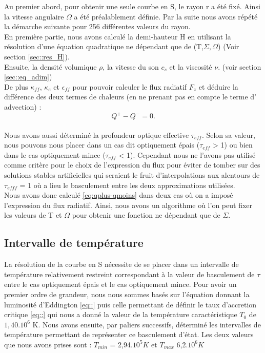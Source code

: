 Au premier abord, pour obtenir une seule courbe en S, le rayon r a été fixé. Ainsi la vitesse angulaire $\Omega$ a été préalablement définie. Par la suite nous avons répété la démarche suivante pour 256 différentes valeurs du rayon.
\\
En première partie, nous avons calculé la demi-hauteur H en utilisant la résolution d'une équation quadratique ne dépendant que de (T,$\Sigma,\Omega$) (Voir section \ref{sec::res_H}).
\\
Ensuite, la densité volumique $\rho$, la vitesse du son $c_s$ et la viscosité $\nu$. (voir section \ref{sec::eq_adim})
\\
De plus $\kappa_{ff}$, $\kappa_{e}$ et $\epsilon_{ff}$ pour pouvoir calculer le flux radiatif $F_z$ et déduire la différence des deux termes de chaleurs (en ne prenant pas en compte le terme d' advection) :
\\
\begin{equation} 
\label{eq:qplus-qmoins}
Q^+ - Q^- = 0. 
\end{equation}
\\
Nous avons aussi déterminé la profondeur optique effective $\tau_{eff}$. Selon sa valeur, nous pouvons nous placer dans un cas dit optiquement épais ($\tau_{eff}$ > 1) ou bien dans le cas optiquement mince  ($\tau_{eff}$ < 1).
Cependant nous ne l'avons pas utilisé comme critère pour le choix de l'expression du flux pour éviter de tomber sur des solutions stables artificielles qui seraient le fruit d'interpolations aux alentours de $\tau_{efff}$ = 1 où a lieu le basculement entre les deux approximations utilisées. 
\\
Nous avons donc calculé \ref{eq:qplus-qmoins} dans deux cas où on a imposé l'expression du flux radiatif. Ainsi, nous avons un algorithme où l'on peut fixer les valeurs de T et $\Omega$ pour obtenir une fonction ne dépendant que de $\Sigma$.

\subsection{Intervalle de température}
La résolution de la courbe en S nécessite de se placer dans un intervalle de température relativement restreint correspondant à la valeur de basculement de $\tau$ entre le cas optiquement épais et le cas optiquement mince.
Pour avoir un premier ordre de grandeur, nous nous sommes basés sur l'équation donnant la luminosité d'Eddington \ref{eq::} puis celle permettant de définir le taux d'accretion critique \ref{eq::} qui nous a donné la valeur de la température caractéristique $T_0$ de $1,40.10^6$ K. Nous avons ensuite, par paliers successifs, déterminé les intervalles de température permettant de représenter ce basculement d'état. Les deux valeurs que nous avons prises sont : $T_{min}$ = 2,94.$10^5 K$ et $T_{max}$ 6,2.$10^6 K$ 
\\
